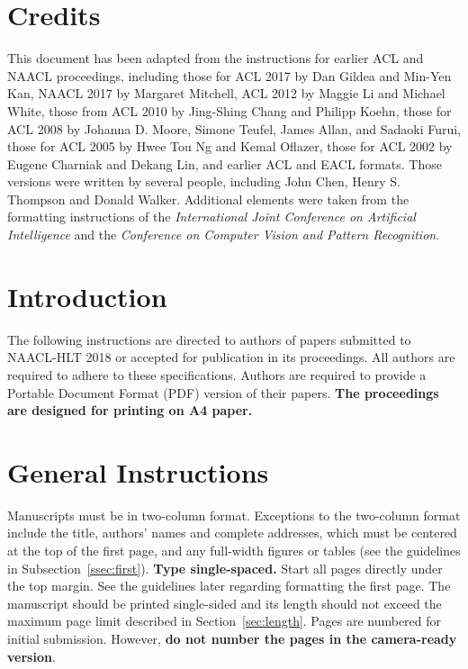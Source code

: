 \section{Credits}

This document has been adapted from the instructions
for earlier ACL and NAACL proceedings,
including those for ACL 2017 by Dan Gildea
and Min-Yen Kan, NAACL 2017 by Margaret
Mitchell, ACL 2012 by Maggie Li and Michael
White, those from ACL 2010 by Jing-Shing Chang
and Philipp Koehn, those for ACL 2008 by Johanna
D. Moore, Simone Teufel, James Allan, and
Sadaoki Furui, those for ACL 2005 by Hwee Tou
Ng and Kemal Oflazer, those for ACL 2002 by Eugene
Charniak and Dekang Lin, and earlier ACL
and EACL formats.
Those versions were written by several
people, including John Chen, Henry S. Thompson and Donald
Walker. Additional elements were taken from the formatting
instructions of the {\em International Joint Conference on Artificial
  Intelligence} and the \emph{Conference on Computer Vision and
  Pattern Recognition}.

\section{Introduction}

The following instructions are directed to authors of papers submitted
to NAACL-HLT 2018 or accepted for publication in its proceedings. All
authors are required to adhere to these specifications. Authors are
required to provide a Portable Document Format (PDF) version of their
papers. \textbf{The proceedings are designed for printing on A4
paper.}

\section{General Instructions}

Manuscripts must be in two-column format.  Exceptions to the
two-column format include the title, authors' names and complete
addresses, which must be centered at the top of the first page, and
any full-width figures or tables (see the guidelines in
Subsection~\ref{ssec:first}). {\bf Type single-spaced.}  Start all
pages directly under the top margin. See the guidelines later
regarding formatting the first page.  The manuscript should be
printed single-sided and its length
should not exceed the maximum page limit described in Section~\ref{sec:length}.
Pages are numbered for  initial submission. However, {\bf do not number the pages in the camera-ready version}.

